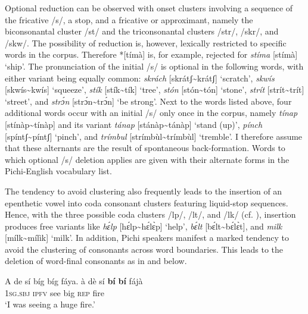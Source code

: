 Optional reduction can be observed with onset clusters involving a sequence of the fricative /s/, a stop, and a fricative or approximant, namely the biconsonantal cluster /st/ and the triconsonantal clusters /str/, /skr/, and /skw/. The possibility of reduction is, however, lexically restricted to specific words in the corpus. Therefore *[tímà] is, for example, rejected for \textit{stíma} [stímà] ‘ship’. The pronunciation of the initial /s/ is optional in the following words, with either variant being equally common: \textit{skrách} [skrátʃ{\textasciitilde}krátʃ] ‘scratch’,\textit{ skwís} [skwís{\textasciitilde}kwís] ‘squeeze’, \textit{stík} [stík{\textasciitilde}tík] ‘tree’, \textit{stón} [stón{\textasciitilde}tón] ‘stone’, \textit{strít} [strít{\textasciitilde}trít] ‘street’, and \textit{strɔ́n} [strɔ́n{\textasciitilde}trɔ́n] ‘be strong’. Next to the words listed above, four additional words occur with an initial /s/ only once in the corpus, namely \textit{tínap} [stínàp{\textasciitilde}tínàp] and its variant \textit{tánap} [stánàp{\textasciitilde}tánàp] ‘stand (up)’, \textit{pínch} [spíntʃ{\textasciitilde}píntʃ] ‘pinch’, and \textit{trímbul} [strímbùl{\textasciitilde}trímbùl] ‘tremble’. I therefore assume that these alternants are the result of spontaneous back-formation. Words to which optional /s/ deletion applies are given with their alternate forms in the Pichi-English vocabulary list.



The tendency to avoid clustering also frequently leads to the insertion of an epenthetic vowel into coda consonant clusters featuring liquid-stop sequences. Hence, with the three possible coda clusters /lp/, /lt/, and /lk/ (cf. ), insertion produces free variants like \textit{hɛ́lp} [hɛ́lp{\textasciitilde}hɛ́lɛ̀p] ‘help’, \textit{bɛ́lt} [bɛ́lt{\textasciitilde}bɛ́lɛ̀t], and \textit{milk} [mílk{\textasciitilde}mílìk] ‘milk’. In addition, Pichi speakers manifest a marked tendency to avoid the clustering of consonants across word boundaries. This leads to the deletion of word-final consonants as in  and  below. 



\ea%
    \label{ex:key:39}
    \gll   A    de  sí    bíg  bíg  fáya.      \ob{}à  dè  sí  \textbf{bí}  \textbf{bí}  fájà\cb\\
\textsc{1sg.sbj}  \textsc{ipfv}  see    big  \textsc{rep}  fire\\

\glt ‘I was seeing a huge fire.’\index{}
\z


